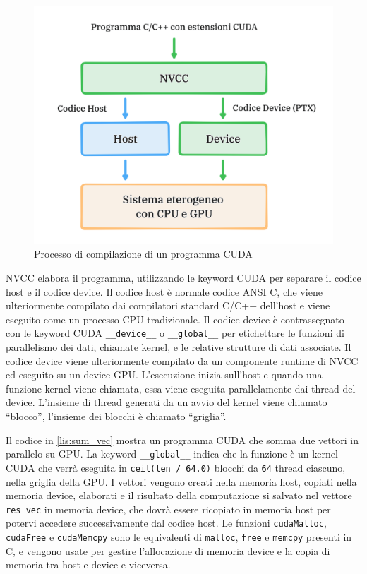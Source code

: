 \begin{figure}[ht]
    \centering
    \includegraphics[width=.9\linewidth]{images/chapter2/nvcc.png}
    \caption{Processo di compilazione di un programma CUDA}
    \label{fig:nvcc}
\end{figure}

NVCC elabora il programma, utilizzando le keyword CUDA per separare il codice host e il codice device. Il codice host è normale codice ANSI C, che viene ulteriormente compilato dai compilatori standard C/C++ dell'host e viene eseguito come un processo CPU tradizionale. Il codice device è contrassegnato con le keyword CUDA \verb|__device__| o \verb|__global__| per etichettare le funzioni di parallelismo dei dati, chiamate kernel, e le relative strutture di dati associate. Il codice device viene ulteriormente compilato da un componente runtime di NVCC ed eseguito su un device GPU. L'esecuzione inizia sull'host e quando una funzione kernel viene chiamata, essa viene eseguita parallelamente dai thread del device. L'insieme di thread generati da un avvio del kernel viene chiamato ``blocco'', l'insieme dei blocchi è chiamato ``griglia''.

\newpage
\vspace{5mm}
 
\vspace{5mm}

Il codice in \ref{lis:sum_vec} mostra un programma CUDA che somma due vettori in parallelo su GPU. La keyword \verb|__global__| indica che la funzione è un kernel CUDA che verrà eseguita in \verb|ceil(len / 64.0)| blocchi da \verb|64| thread ciascuno, nella griglia della GPU. I vettori vengono creati nella memoria host, copiati nella memoria device, elaborati e il risultato della computazione si salvato nel vettore \verb|res_vec| in memoria device, che dovrà essere ricopiato in memoria host per potervi accedere successivamente dal codice host. Le funzioni \verb|cudaMalloc|, \verb|cudaFree| e \verb|cudaMemcpy| sono le equivalenti di \verb|malloc|, \verb|free| e \verb|memcpy| presenti in C, e vengono usate per gestire l'allocazione di memoria device e la copia di memoria tra host e device e viceversa.

